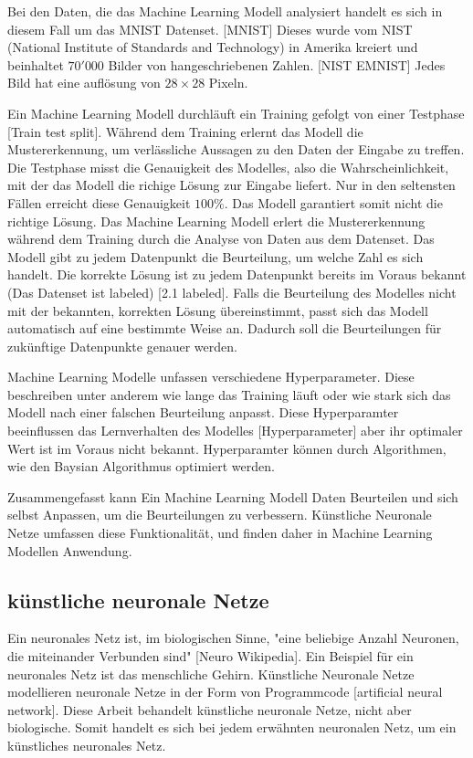 Bei den Daten, die das Machine Learning Modell analysiert handelt es sich in
diesem Fall um das MNIST Datenset. [MNIST]  Dieses wurde vom NIST (National Institute of
Standards and Technology) in Amerika kreiert und beinhaltet $70'000$ Bilder von
hangeschriebenen Zahlen. [NIST EMNIST] Jedes Bild hat eine auflösung von $28\times28$ Pixeln.
                

Ein Machine Learning Modell durchläuft ein Training gefolgt von einer
Testphase [Train test split]. Während dem Training erlernt das Modell die Mustererkennung, um
verlässliche Aussagen zu den Daten der Eingabe zu treffen. Die Testphase misst
die Genauigkeit des Modelles, also die Wahrscheinlichkeit, mit der das Modell
die richige Lösung zur Eingabe liefert. Nur in den seltensten Fällen erreicht
diese Genauigkeit $100\%$. Das Modell garantiert somit nicht die richtige
Lösung. Das Machine Learning Modell erlert die Mustererkennung während dem
Training durch die Analyse von Daten aus dem Datenset. Das Modell gibt zu
jedem Datenpunkt die Beurteilung, um welche Zahl es sich handelt. Die korrekte
Lösung ist zu jedem Datenpunkt bereits im Voraus bekannt (Das Datenset ist
labeled) [2.1 labeled]. Falls die Beurteilung des Modelles nicht mit der bekannten, korrekten
Lösung übereinstimmt, passt sich das Modell automatisch auf eine bestimmte Weise
an. Dadurch soll die Beurteilungen für zukünftige Datenpunkte genauer werden.

Machine Learning Modelle unfassen verschiedene Hyperparameter. Diese beschreiben
unter anderem wie lange das Training läuft oder wie stark sich das Modell nach
einer falschen Beurteilung anpasst. Diese Hyperparamter beeinflussen das
Lernverhalten des Modelles [Hyperparameter] aber ihr optimaler Wert ist im
Voraus nicht bekannt. Hyperparamter können durch Algorithmen, wie den Baysian
Algorithmus optimiert werden.

Zusammengefasst kann Ein Machine Learning Modell Daten Beurteilen und sich selbst Anpassen,
um die Beurteilungen zu verbessern. Künstliche Neuronale Netze umfassen diese
Funktionalität, und finden daher in Machine Learning Modellen Anwendung.


\subsection*{künstliche neuronale Netze}

Ein neuronales Netz ist, im biologischen Sinne, "eine beliebige Anzahl Neuronen,
die miteinander Verbunden sind" [Neuro Wikipedia]. Ein Beispiel für ein neuronales
Netz ist das menschliche Gehirn. Künstliche Neuronale Netze modellieren
neuronale Netze in der Form von Programmcode [artificial neural network]. Diese Arbeit behandelt künstliche
neuronale Netze, nicht aber biologische. Somit handelt es sich bei jedem
erwähnten neuronalen Netz, um ein künstliches neuronales Netz.

